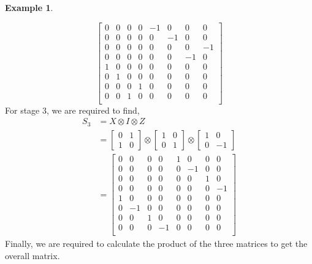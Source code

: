 \documentclass[12pt, oneside]{book}
\theoremstyle{definition}
\theoremstyle{definition}
\newtheorem{example}{Example}[section]
\theoremstyle{remark}
\begin{document}
\begin{example}
\begin{enumerate}
\[\begin{bmatrix}
                0 & 0 & 0 & 0 & -1 & 0 & 0 & 0 \\
                0 & 0 & 0 & 0 & 0 & -1 & 0 & 0 \\
                0 & 0 & 0 & 0 & 0 & 0 & 0 & -1 \\
                0 & 0 & 0 & 0 & 0 & 0 & -1 & 0 \\
                1 & 0 & 0 & 0 & 0 & 0 & 0 & 0 \\
                0 & 1 & 0 & 0 & 0 & 0 & 0 & 0 \\
                0 & 0 & 0 & 1 & 0 & 0 & 0 & 0 \\
                0 & 0 & 1 & 0 & 0 & 0 & 0 & 0 \\
            \end{bmatrix}
        \]
        For stage 3, we are required to find,
        \begin{align*}
            S_3 &= X \otimes I \otimes Z \\
            &= \begin{bmatrix} 0 & 1 \\ 1 & 0 \end{bmatrix} \otimes \begin{bmatrix} 1 & 0 \\ 0 & 1 \end{bmatrix} \otimes \begin{bmatrix} 1 & 0 \\ 0 & -1 \end{bmatrix} \\
            &= \begin{bmatrix} 0 & 0 & 0 & 0 & 1 & 0 & 0 & 0 \\
                0 & 0 & 0 & 0 & 0 & -1 & 0 & 0 \\
                0 & 0 & 0 & 0 & 0 & 0 & 1 & 0 \\
                0 & 0 & 0 & 0 & 0 & 0 & 0 & -1 \\
                1 & 0 & 0 & 0 & 0 & 0 & 0 & 0 \\
                0 & -1 & 0 & 0 & 0 & 0 & 0 & 0 \\
                0 & 0 & 1 & 0 & 0 & 0 & 0 & 0 \\
                0 & 0 & 0 & -1 & 0 & 0 & 0 & 0 \\
            \end{bmatrix} 
        \end{align*}
        Finally, we are required to calculate the product of the three matrices to get the overall matrix.
        \begin{align*} 

\end{align*}
\end{enumerate}
\end{example}
\end{document}
